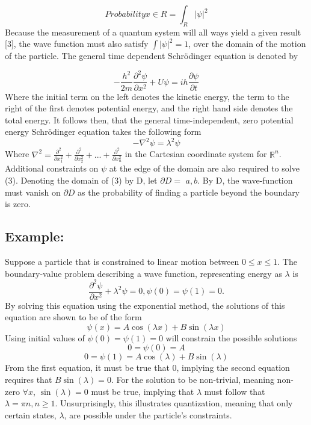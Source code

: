 \documentclass{article}
\begin{document}
\begin{equation}
    Probability{x \in R} = \int_{R} |\psi|^2
\end{equation}
Because the measurement of a quantum system will all ways yield a given result [3], the wave function must also satisfy $\int |\psi|^2 =1$, over the domain of the motion of the particle. The general time dependent Schrödinger equation is denoted by 

\begin{equation}
	-\frac{h^2}{2m}\frac{\partial^2 \psi}{\partial x^2}+U\psi = ih\frac{\partial\psi}{\partial t}
\end{equation}
   Where the initial term on the left denotes  the kinetic energy, the term to the right of the first denotes potential energy, and the right hand side denotes the total energy. It follows then, that the general time-independent, zero potential energy Schrödinger equation takes the following form
\begin{equation}
    -\nabla^2\psi=\lambda^2\psi
\end{equation}
Where $\nabla^2= \frac{\partial^2}{\partial x_{1}^2}+\frac{\partial^2}{\partial x_{2}^2}+...+\frac{\partial^2}{\partial x_{n}^2} $  in the Cartesian coordinate system for $\mathbb{R}^n$. Additional constraints on $\psi$ at the edge of the domain are also required to solve (3). Denoting the domain of (3) by D, let  $\partial D=$ {$a, b$}. By D, the wave-function must vanish on $\partial D$ as the probability of finding a particle beyond the boundary is zero. 

\subsection{Example:}
Suppose a particle that is constrained to linear motion between $0 \leq x \leq 1$. The boundary-value problem describing a wave function, representing energy as $\lambda$ is 
\begin{equation*}
\frac{\partial^2 \psi}{\partial x^2}+\lambda^2\psi=0,          \psi(0)=\psi(1)=0.
\end{equation*}
By solving this equation using the exponential method, the solutions of this equation are shown to be of the form
\begin{equation*}
    \psi(x)=A\cos(\lambda x)+B\sin(\lambda x)
\end{equation*}
Using initial values of $\psi(0)=\psi(1)=0$ will constrain the possible solutions  
\begin{equation*}
    0=\psi(0)=A
\end{equation*}\begin{equation*}
      0=\psi(1)=A\cos(\lambda)+B\sin(\lambda)
\end{equation*}
From the first equation, it must be true that 0, implying the second equation requires that $B\sin(\lambda)=0$. For the solution to be non-trivial, meaning non-zero $\forall x$,   $\sin(\lambda)=0$ must be true, implying that $\lambda$ must follow that $\lambda=\pi n, n \ge 1.$ Unsurprisingly, this illustrates quantization, meaning that only certain states, $\lambda$, are possible under the particle's constraints.
\end{document}
